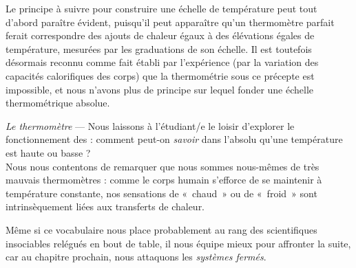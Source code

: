 					Le principe à suivre pour construire une échelle de température peut tout d’abord paraître évident, puisqu’il peut apparaître qu’un thermomètre parfait ferait correspondre des ajouts de chaleur égaux à des élévations égales de température, mesurées par les graduations de son échelle. Il est toutefois désormais reconnu comme fait établi par l’expérience (par la variation des capacités calorifiques des corps) que la thermométrie sous ce précepte est impossible, et nous n’avons plus de principe sur lequel fonder une échelle thermométrique absolue.
				\vspace{-0.7em}~\vspace{-1.8em}%
			\begin{description}
			\item \textit{Le thermomètre} --- Nous laissons à l’étudiant/e le loisir d’explorer le fonctionnement des  : comment peut-on \emph{savoir} dans l’absolu qu’une température est haute ou basse ?\\
				Nous nous contentons de remarquer que nous sommes nous-mêmes de très mauvais thermomètres : comme le corps humain s’efforce de se maintenir à température constante, nos sensations de «~chaud~» ou de «~froid~» sont intrinsèquement liées aux transferts de chaleur.

		\end{description}
		
	Même si ce vocabulaire nous place probablement au rang des scientifiques insociables relégués en bout de table, il nous équipe mieux pour affronter la suite, car au chapitre prochain, nous attaquons les \textit{systèmes fermés}.

